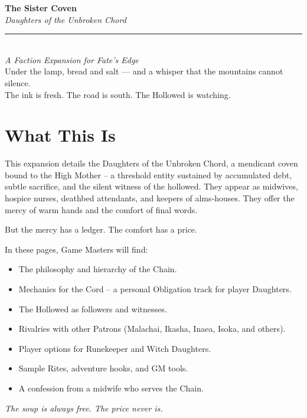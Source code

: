 \documentclass[10pt,twoside]{book}
\begin{document}
\titlepage
\begin{center}
\vspace*{2cm}
{\huge\bfseries\color{threadRed} The Sister Coven}\\[0.8cm]
{\Large\itshape Daughters of the Unbroken Chord}\\[1.5cm]
\rule{0.6\textwidth}{1pt}\\[0.5cm]
\emph{A Faction Expansion for Fate's Edge}\\[1cm]
\vfill
{\small \textcolor{chainGrey}{Under the lamp, bread and salt — and a whisper that the mountains cannot silence.}}\\[0.2cm]
{\small \textcolor{chainGrey}{The ink is fresh. The road is south. The Hollowed is watching.}}
\end{center}
\newpage

\chapter*{What This Is}
This expansion details the Daughters of the Unbroken Chord, a mendicant coven bound to the High Mother – a threshold entity sustained by accumulated debt, subtle sacrifice, and the silent witness of the hollowed. They appear as midwives, hospice nurses, deathbed attendants, and keepers of alms‑houses. They offer the mercy of warm hands and the comfort of final words.

But the mercy has a ledger. The comfort has a price.

In these pages, Game Masters will find:
\begin{itemize}
\item The philosophy and hierarchy of the Chain.
\item Mechanics for the Cord – a personal Obligation track for player Daughters.
\item The Hollowed as followers and witnesses.
\item Rivalries with other Patrons (Malachai, Ikasha, Inaea, Isoka, and others).
\item Player options for Runekeeper and Witch Daughters.
\item Sample Rites, adventure hooks, and GM tools.
\item A confession from a midwife who serves the Chain.
\end{itemize}

\emph{The soup is always free. The price never is.}
\end{document}
